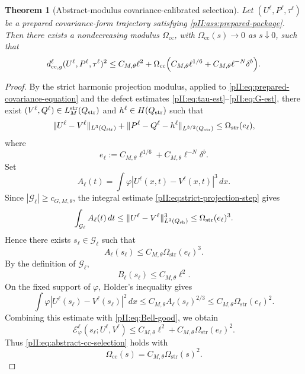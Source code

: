 \documentclass[11pt]{article}
\numberwithin{equation}{section}
\theoremstyle{plain}
\newtheorem{theorem}{Theorem}[section]
\theoremstyle{definition}
\theoremstyle{remark}
\newcommand{\str}{\mathrm{str}}
\newcommand{\cc}{\mathrm{cc}}
\newcommand{\dx}{\,dx}
\newcommand{\dt}{\,dt}
\begin{document}
\begin{theorem}[Abstract-modulus covariance-calibrated selection]\label{pII:thm:abstract-cc-selection}
Let $(U^\ell,P^\ell,\tau^\ell)$ be a prepared covariance-form trajectory satisfying \cref{pII:ass:prepared-package}.  Then there exists a nondecreasing modulus $\Omega_{\cc}$, with $\Omega_{\cc}(s)\to0$ as $s\downarrow0$, such that
\begin{equation}\label{pII:eq:abstract-cc-selection}
        d^\ell_{\cc,g}(U^\ell,P^\ell,\tau^\ell)^2
        \le C_{M,\theta}\ell^2+
        \Omega_{\cc}\Bigl(C_{M,\theta}\ell^{1/6}+C_{M,\theta}\ell^{-N}\delta^b\Bigr).
\end{equation}
\end{theorem}

\begin{proof}
By the strict harmonic projection modulus, applied to \eqref{pII:eq:prepared-covariance-equation} and the defect estimates \eqref{pII:eq:tau-est}--\eqref{pII:eq:G-est}, there exist $(V^\ell,Q^\ell)\in L_M^{\str}(Q_{\rm str})$ and $h^\ell\in H(Q_{\rm str})$ such that
\begin{equation}\label{pII:eq:strict-projection-step}
        \|U^\ell-V^\ell\|_{L^3(Q_{\rm str})}
        +\|P^\ell-Q^\ell-h^\ell\|_{L^{3/2}(Q_{\rm str})}
        \le \Omega_{\str}(e_\ell),
\end{equation}
where
\begin{equation}\label{pII:eq:eell}
        e_\ell:=C_{M,\theta}\ell^{1/6}+C_{M,\theta}\ell^{-N}\delta^b.
\end{equation}
Set
\[
        A_\ell(t)=\int\varphi|U^\ell(x,t)-V^\ell(x,t)|^3\dx .
\]
Since $|\mathcal G_\ell|\ge c_{G,M,\theta}$, the integral estimate \eqref{pII:eq:strict-projection-step} gives
\[
        \int_{\mathcal G_\ell}A_\ell(t)\dt
        \le \|U^\ell-V^\ell\|_{L^3(Q_{\rm sh})}^3
        \le \Omega_{\str}(e_\ell)^3.
\]
Hence there exists $s_\ell\in\mathcal G_\ell$ such that
\begin{equation}\label{pII:eq:Aell-good}
        A_\ell(s_\ell)\le C_{M,\theta}\Omega_{\str}(e_\ell)^3.
\end{equation}
By the definition of $\mathcal G_\ell$,
\begin{equation}\label{pII:eq:Bell-good}
        B_\ell(s_\ell)\le C_{M,\theta}\ell^2.
\end{equation}
On the fixed support of $\varphi$, Holder's inequality gives
\[
        \int\varphi|U^\ell(s_\ell)-V^\ell(s_\ell)|^2\dx
        \le C_{M,\theta}A_\ell(s_\ell)^{2/3}
        \le C_{M,\theta}\Omega_{\str}(e_\ell)^2.
\]
Combining this estimate with \eqref{pII:eq:Bell-good}, we obtain
\[
        \mathcal E_\varphi^\ell(s_\ell;U^\ell,V^\ell)
        \le C_{M,\theta}\ell^2+C_{M,\theta}\Omega_{\str}(e_\ell)^2.
\]
Thus \eqref{pII:eq:abstract-cc-selection} holds with
\[
        \Omega_{\cc}(s)=C_{M,\theta}\Omega_{\str}(s)^2.
\]
\end{proof}
\end{document}
